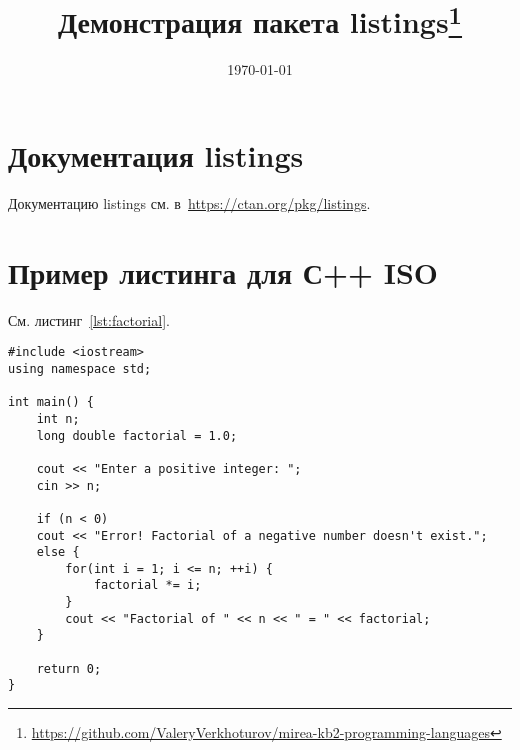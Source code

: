 \documentclass{../mirea-prog-lang}
\title{Демонстрация пакета listings\footnote{\url{https://github.com/ValeryVerkhoturov/mirea-kb2-programming-languages}}}
\date{\today}
\begin{document}
	
\maketitle
\addtocounter{page}{1}
	
\tableofcontents
	
\section{Документация listings}

Документацию listings см. в~\url{https://ctan.org/pkg/listings}.


\section{Пример листинга для С++ ISO}

См. листинг~\ref{lst:factorial}.

\begin{lstlisting}[language={[ISO]{C++}}, caption={Нахождение факториала}, label=lst:factorial]
#include <iostream>
using namespace std;

int main() {
	int n;
	long double factorial = 1.0;
	
	cout << "Enter a positive integer: ";
	cin >> n;
	
	if (n < 0)
	cout << "Error! Factorial of a negative number doesn't exist.";
	else {
		for(int i = 1; i <= n; ++i) {
			factorial *= i;
		}
		cout << "Factorial of " << n << " = " << factorial;    
	}
	
	return 0;
}
\end{lstlisting}
\end{document}
